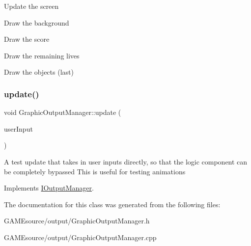Update the screen
\begin{DoxyItemize}
\item Draw the background
\item Draw the score
\item Draw the remaining lives
\item Draw the objects (last) 
\end{DoxyItemize}\mbox{\label{class_graphic_output_manager_a64226361d4d827e5c16b76fcf86f4f6f}} 
\subsubsection{\texorpdfstring{update()}{update()}\hspace{0.1cm}{\footnotesize\ttfamily [2/2]}}
{\footnotesize\ttfamily void Graphic\+Output\+Manager\+::update (\begin{DoxyParamCaption}\item[{User\+Input\+Type}]{user\+Input }\end{DoxyParamCaption})\hspace{0.3cm}{\ttfamily [virtual]}}

A test update that takes in user inputs directly, so that the logic component can be completely bypassed This is useful for testing animations 

Implements \mbox{\hyperlink{class_i_output_manager_aef1aaf499f3eee5927cb2833af39ce43}{I\+Output\+Manager}}.



The documentation for this class was generated from the following files\+:\begin{DoxyCompactItemize}
\item 
G\+A\+M\+Esource/output/Graphic\+Output\+Manager.\+h\item 
G\+A\+M\+Esource/output/Graphic\+Output\+Manager.\+cpp\end{DoxyCompactItemize}
